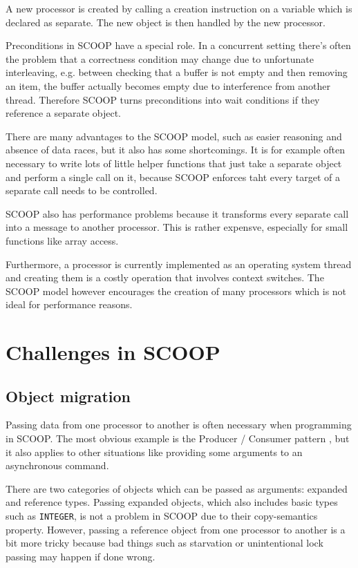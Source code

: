 \documentclass[a4paper,10pt,titlepage]{article}
\begin{document}
A new processor is created by calling a creation instruction on a variable which is declared as separate.
The new object is then handled by the new processor.

Preconditions in SCOOP have a special role.
In a concurrent setting there's often the problem that a correctness condition may change due to unfortunate interleaving, 
e.g. between checking that a buffer is not empty and then removing an item, the buffer actually becomes empty due to interference from another thread.
Therefore SCOOP turns preconditions into wait conditions if they reference a separate object.

There are many advantages to the SCOOP model, such as easier reasoning and absence of data races, but it also has some shortcomings.
It is for example often necessary to write lots of little helper functions that just take a separate object and perform a single call on it,
because SCOOP enforces taht every target of a separate call needs to be controlled.

SCOOP also has performance problems because it transforms every separate call into a message to another processor.
This is rather expensve, especially for small functions like array access.

Furthermore, a processor is currently implemented as an operating system thread and creating them is a costly operation that involves context switches.
The SCOOP model however encourages the creation of many processors which is not ideal for performance reasons.

\section{Challenges in SCOOP}
\label{sec:scoop-challenges}

\subsection{Object migration}
\label{sec:object-migration}

Passing data from one processor to another is often necessary when programming in SCOOP.
The most obvious example is the Producer / Consumer pattern , but it also applies to other situations like providing some arguments to an asynchronous command.

There are two categories of objects which can be passed as arguments: expanded and reference types.
Passing expanded objects, which also includes basic types such as \lstinline!INTEGER!, is not a problem in SCOOP due to their copy-semantics property.
However, passing a reference object from one processor to another is a bit more tricky
because bad things such as starvation or unintentional lock passing may happen if done wrong.
\end{document}
